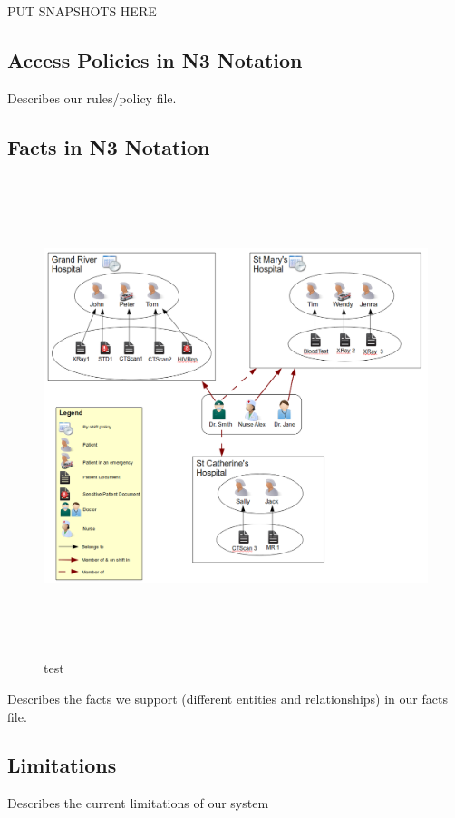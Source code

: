\documentclass[conference]{IEEEtran}
\begin{document}
PUT SNAPSHOTS HERE

\subsection{Access Policies in N3 Notation}
\label{rules-sec}

Describes our rules/policy file. 

\subsection{Facts in N3 Notation}

\begin{figure}[t]
\centering
\includegraphics[width=16cm,height=14cm]{BigPicture.png}
\caption{test}
\label{fig:allfacts}
\end{figure}


Describes the facts we support (different entities and relationships) in our facts file.

\subsection{Limitations}

Describes the current limitations of our system
\end{document}
